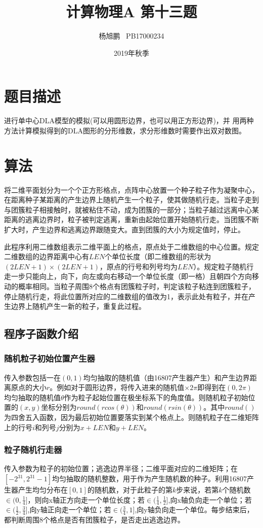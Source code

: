 \documentclass[a4paper,11pt]{article}
\author{ 杨旭鹏  \  PB17000234}
\date{2019年秋季}
\title{计算物理A 第十三题}
\begin{document}
\maketitle
\tableofcontents

\section{题目描述}
进行单中心DLA模型的模拟(可以用圆形边界，也可以用正方形边界)，并 用两种方法计算模拟得到的DLA图形的分形维数，求分形维数时需要作出双对数图。 
\section{算法}
将二维平面划分为一个个正方形格点，点阵中⼼放置⼀个种⼦粒⼦作为凝聚中⼼，在距离种⼦某距离的产生边界上随机产⽣⼀个粒⼦，使其做随机⾏⾛。当粒⼦⾛到与团簇粒子相接触时，就被粘住不动，成为团簇的⼀部分；当粒⼦越过远离中⼼某距离的逃离边界时，粒⼦被判定逃离，重新由起始位置开始随机行走。当团簇不断扩大时，产生边界和逃离边界跟随变大。直到团簇的大小为规定值时，停止。

此程序利用二维数组表示二维平面上的格点，原点处于二维数组的中心位置。规定二维数组的边界距离中心有$LEN$个单位长度（即二维数组的形状为$(2LEN+1)\times (2LEN+1)$，原点的行号和列号均为$LEN$）。规定粒子随机行走一步只能向上，向下，向左或向右移动一个单位长度（即一格）且朝四个方向移动的概率相同。当粒子周围8个格点有团簇粒子时，判定该粒子粘连到团簇粒子，停止随机行走，将此位置所对应的二维数组的值改为1，表示此处有粒子，并在产生边界上随机产生一新的粒子，重复此过程。



\subsection{程序子函数介绍}
\subsubsection{随机粒子初始位置产生器}
传入参数包括一在$(0,1)$均匀抽取的随机值（由16807产生器产生）和产生边界距离原点的大小$r$。例如对于圆形边界，将传入进来的随机值$\times 2\pi $即得到在$(0,2\pi)$均匀抽取的随机值$\theta$作为粒子起始位置在极坐标系下的角度值。则随机粒子初始位置的$(x,y)$坐标分别为$round(r cos(\theta))$和$round(r sin(\theta))$。其中$round()$为四舍五入函数，因为最后初始位置要落实到某个格点上。则随机粒子在二维矩阵上的行号$i$和列号$j$分别为$x+LEN$和$y+LEN$。


\subsubsection{粒子随机行走器}
传入参数为粒子的初始位置；逃逸边界半径；二维平面对应的二维矩阵；在$[-2^{31},2^{31}-1]$均匀抽取的随机整数，用于作为产生随机数的种子。利用16807产生器产生均匀分布在$[0,1]$的随机数，对于此粒子的第$k$步来说，若第$k$个随机数$\in (0,\frac{1}{4}]$，则向x轴正方向走一个单位长度；若$\in (\frac{1}{4},\frac{1}{2}]$,向x轴负向走一个单位；若$\in (\frac{1}{2},\frac{3}{4}]$,向y轴正向走一个单位；若$\in (\frac{3}{4},1]$,向y轴负向走一个单位。每步结束后，都判断周围8个格点是否有团簇粒子，是否走出逃逸边界。
\end{document}
